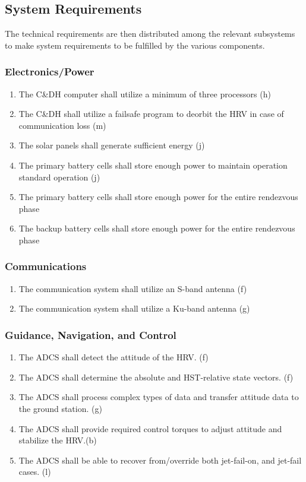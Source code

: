 \documentclass[paper=letter, fontsize=11pt]{scrartcl} %
\numberwithin{equation}{section} %
\numberwithin{figure}{section} %
\numberwithin{table}{section} %
\begin{document}
\subsection{System Requirements}
The technical requirements are then distributed among the relevant subsystems to make system requirements to be fulfilled by the various components.

\subsubsection{Electronics/Power}
\begin{enumerate}
\item The C\&DH computer shall utilize a minimum of three processors (h)
\item The C\&DH shall utilize a failsafe program to deorbit the HRV in case of communication loss (m)
\item The solar panels shall generate sufficient energy (j)
\item The primary battery cells shall store enough power to maintain operation standard operation (j)
\item The primary battery cells shall store enough power for the entire rendezvous phase
\item The backup battery cells shall store enough power for the entire rendezvous phase
\end{enumerate}

\subsubsection{Communications}
\begin{enumerate}
\item The communication system shall utilize an S-band antenna (f)
\item The communication system shall utilize a Ku-band antenna (g)
\end{enumerate}

\subsubsection{Guidance, Navigation, and Control}
\begin{enumerate}
\item The ADCS shall detect the attitude of the HRV. (f)
\item The ADCS shall determine the absolute and HST-relative state vectors. (f)
\item The ADCS shall process complex types of data and transfer attitude data to the ground station. (g)
\item The ADCS shall provide required control torques to adjust attitude and stabilize the HRV.(b)
\item The ADCS shall be able to recover from/override both jet-fail-on, and jet-fail cases. (l)
\end{enumerate}
\end{document}
